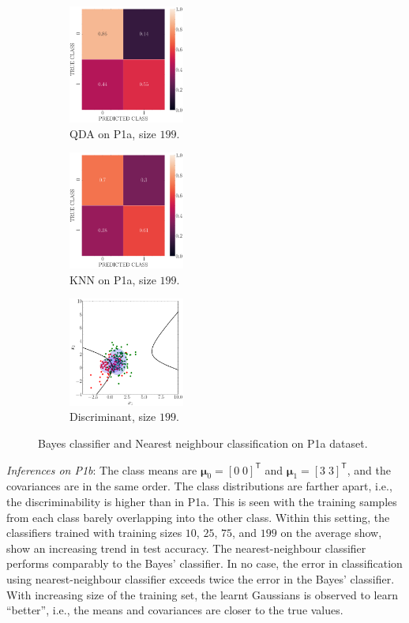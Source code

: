 \documentclass[11pt, a4 paper]{article}
\newcommand{\TT}{\mathsf{T}}
\newcommand{\bmu}{\boldsymbol{\mu}}
\begin{document}
\begin{figure}[!htbp]
\quad    
    \begin{subfigure}[!htbp]{0.24\textwidth}
       \centering
       \includegraphics[width=1.5in]{../results/ex1/conf_mtx_QD_ML_dataset_P1a_size_199.pdf}
       \caption{QDA on P1a, size $199$.}
       \label{fig:QDA_P1a_199}
    \end{subfigure}
\quad    
    \begin{subfigure}[!htbp]{0.24\textwidth}
       \centering
       \includegraphics[width=1.5in]{../results/ex1/conf_mtx_KNN_dataset_P1a_size_199.pdf}
       \caption{KNN on P1a, size $199$.}
       \label{fig:KNN_P1a_199}
    \end{subfigure}
\quad
    \begin{subfigure}[!htbp]{0.24\textwidth}
       \centering
       \includegraphics[width=1.5in]{../results/ex1/samples_QD_ML_dataset_P1a_size_199.pdf}
       \caption{Discriminant, size $199$.}
       \label{fig:DF_P1a_199}
    \end{subfigure}

\caption{Bayes classifier and Nearest neighbour classification on P1a dataset.}
\label{fig:ex11P1a}
\end{figure}

{\it Inferences on P1b}: The class means are $\bmu_{0} = [0 \; 0]^{\TT}$ and $\bmu_{1} = [3 \; 3]^{\TT}$, and the covariances are in the same order. The class distributions are farther apart, i.e., the discriminability is higher than in P1a. This is seen with the training samples from each class barely overlapping into the other class. Within this setting, the classifiers trained with training sizes $10$, $25$, $75$, and $199$ on the average show, show an increasing trend in test accuracy. The nearest-neighbour classifier performs comparably to the Bayes' classifier. In no case, the error in classification using nearest-neighbour classifier exceeds twice the error in the Bayes' classifier. With increasing size of the training set, the learnt Gaussians is observed to learn ``better'', i.e., the means and covariances are closer to the true values.
\end{document}

